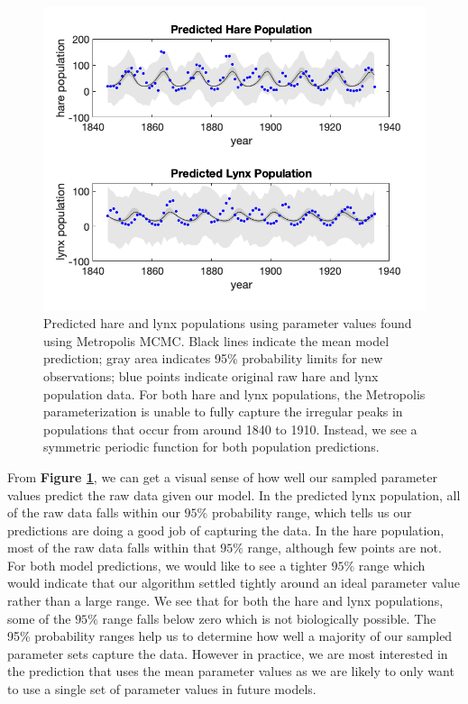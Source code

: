 \documentclass{article}
\begin{document}
\begin{figure}[H]
    \centering
    \includegraphics[width=15cm]{MCMC_figs/final_mh_modpred.png}
    \caption{Predicted hare and lynx populations using parameter values found using Metropolis MCMC. Black lines indicate the mean model prediction; gray area indicates 95$\%$ probability limits for new observations; blue points indicate original raw hare and lynx population data. For both hare and lynx populations, the Metropolis parameterization is unable to fully capture the irregular peaks in populations that occur from around 1840 to 1910. Instead, we see a symmetric periodic function for both population predictions.}
    \label{fig:5mcmc}
\end{figure}
From \textbf{Figure \ref{fig:5mcmc}}, we can get a visual sense of how well our sampled parameter values predict the raw data given our model. In the predicted lynx population, all of the raw data falls within our $95\%$ probability range, which tells us our predictions are doing a good job of capturing the data. In the hare population, most of the raw data falls within that $95\%$ range, although few points are not. For both model predictions, we would like to see a tighter $95\%$ range which would indicate that our algorithm settled tightly around an ideal parameter value rather than a large range. We see that for both the hare and lynx populations, some of the $95\%$ range falls below zero which is not biologically possible. The 95\% probability ranges help us to determine how well a majority of our sampled parameter sets capture the data. However in practice, we are most interested in the prediction that uses the mean parameter values as we are likely to only want to use a single set of parameter values in future models.
\end{document}
